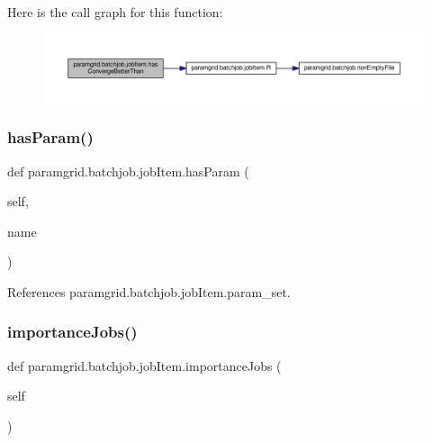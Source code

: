 Here is the call graph for this function\+:
\nopagebreak
\begin{figure}[H]
\begin{center}
\leavevmode
\includegraphics[width=350pt]{classparamgrid_1_1batchjob_1_1jobItem_a3cb0464ed8b1746556b0cfdb513f6fa4_cgraph}
\end{center}
\end{figure}
\mbox{\label{classparamgrid_1_1batchjob_1_1jobItem_ad4e818970f5aaee317480ad927afe583}} 
\subsubsection{\texorpdfstring{has\+Param()}{hasParam()}}
{\footnotesize\ttfamily def paramgrid.\+batchjob.\+job\+Item.\+has\+Param (\begin{DoxyParamCaption}\item[{}]{self,  }\item[{}]{name }\end{DoxyParamCaption})}



References paramgrid.\+batchjob.\+job\+Item.\+param\+\_\+set.

\mbox{\label{classparamgrid_1_1batchjob_1_1jobItem_aa515c3a39c340bcefa63c30e564ad24d}} 
\subsubsection{\texorpdfstring{importance\+Jobs()}{importanceJobs()}}
{\footnotesize\ttfamily def paramgrid.\+batchjob.\+job\+Item.\+importance\+Jobs (\begin{DoxyParamCaption}\item[{}]{self }\end{DoxyParamCaption})}



